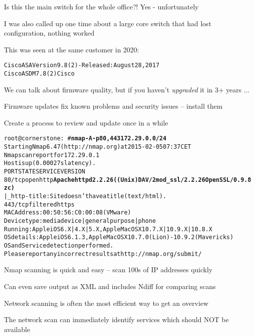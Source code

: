 \documentclass[Screen16to9,17pt]{foils}
\begin{document}

\begin{list2}
\item Is this the main switch for the whole office?! Yes - unfortunately
\item I was also called up one time about a large core switch that had lost configuration, nothing worked
\end{list2}



This was seen at the same customer in 2020:
\begin{alltt}
Cisco ASA Version 9.8(2) - Released: August 28, 2017
Cisco ASDM 7.8(2)Cisco
\end{alltt}

\begin{list2}
\item We can talk about firmware quality, but if you haven't \emph{upgraded} it in 3+ years ...
\item Firmware updates fix known problems and security issues -- install them
\item Create a process to review and update once in a while
\end{list2}


\begin{alltt}\scriptsize
root@cornerstone:~#{\bfseries nmap -A -p80,443 172.29.0.0/24}
Starting Nmap 6.47 ( http://nmap.org ) at 2015-02-05 07:37 CET
Nmap scan report for 172.29.0.1
Host is up (0.00027s latency).
PORT    STATE    SERVICE VERSION
80/tcp  open     http    {\bf Apache httpd 2.2.26 ((Unix) DAV/2 mod_ssl/2.2.26 OpenSSL/0.9.8zc)}
|_http-title: Site doesn't have a title (text/html).
443/tcp filtered https
MAC Address: 00:50:56:C0:00:08 (VMware)
Device type: media device|general purpose|phone
Running: Apple iOS 6.X|4.X|5.X, Apple Mac OS X 10.7.X|10.9.X|10.8.X
OS details: Apple iOS 6.1.3, Apple Mac OS X 10.7.0 (Lion) - 10.9.2 (Mavericks)
OS and Service detection performed.
Please report any incorrect results at http://nmap.org/submit/
\end{alltt}

\begin{list2}
\item Nmap scanning is quick and easy -- scan 100s of IP addresses quickly
\item Can even save output as XML and includes Ndiff for comparing scans
\item Network scanning is often the most efficient way to get an overview
\item The network scan can immediately identify services which should NOT be available
\end{list2}
\end{document}

